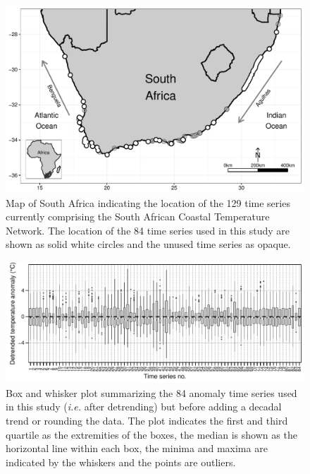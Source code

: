 \documentclass[]{ametsoc}
\begin{document}
%
\begin{figure}
\centering \includegraphics[width=1.0\textwidth]{figure01}
\caption{Map of South Africa indicating the location of the 129 time series currently comprising the South African Coastal Temperature Network. The location of the 84 time series used in this study are shown as solid white circles and the unused time series as opaque.}
\label{figure01}
\end{figure}

\begin{figure}
\centering \includegraphics[width=1.0\textwidth]{figure02}
\caption{Box and whisker plot summarizing the 84 anomaly time series used in this study (\emph{i.e.} after detrending) but before adding a decadal trend or rounding the data. The plot indicates the first and third quartile as the extremities of the boxes, the median is shown as the horizontal line within each box, the minima and maxima are indicated by the whiskers and the points are outliers.}
\label{figure02}
\end{figure}
\end{document}
